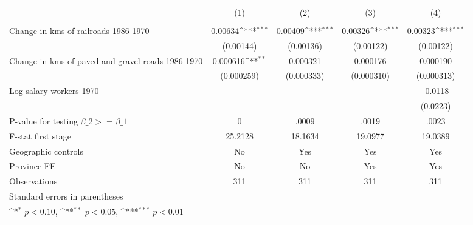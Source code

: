{
\def\sym#1{\ifmmode^{#1}\else\(^{#1}\)\fi}
\begin{tabular}{l*{4}{c}}
\hline\hline
                &\multicolumn{1}{c}{(1)}&\multicolumn{1}{c}{(2)}&\multicolumn{1}{c}{(3)}&\multicolumn{1}{c}{(4)}\\
                &\multicolumn{1}{c}{}&\multicolumn{1}{c}{}&\multicolumn{1}{c}{}&\multicolumn{1}{c}{}\\
\hline
Change in kms of railroads 1986-1970&  0.00634\sym{***}&  0.00409\sym{***}&  0.00326\sym{***}&  0.00323\sym{***}\\
                &(0.00144)         &(0.00136)         &(0.00122)         &(0.00122)         \\
[1em]
Change in kms of paved and gravel roads 1986-1970& 0.000616\sym{**} & 0.000321         & 0.000176         & 0.000190         \\
                &(0.000259)         &(0.000333)         &(0.000310)         &(0.000313)         \\
[1em]
Log salary workers 1970&                  &                  &                  &  -0.0118         \\
                &                  &                  &                  & (0.0223)         \\
\hline
P-value for testing $\beta\_{2} >= \beta\_{1}$&        0         &    .0009         &    .0019         &    .0023         \\
F-stat first stage&  25.2128         &  18.1634         &  19.0977         &  19.0389         \\
Geographic controls&       No         &      Yes         &      Yes         &      Yes         \\
Province FE     &       No         &       No         &      Yes         &      Yes         \\
Observations    &      311         &      311         &      311         &      311         \\
\hline\hline
\multicolumn{5}{l}{\footnotesize Standard errors in parentheses}\\
\multicolumn{5}{l}{\footnotesize \sym{*} \(p<0.10\), \sym{**} \(p<0.05\), \sym{***} \(p<0.01\)}\\
\end{tabular}
}
